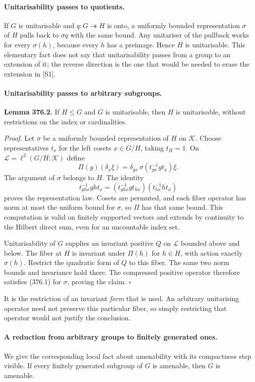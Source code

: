 \documentclass[11pt]{article}
\begin{document}
\paragraph{Unitarisability passes to quotients.}
If $G$ is unitarisable and $q:G\twoheadrightarrow H$ is onto, a
uniformly bounded representation $\sigma$ of $H$ pulls back to
$\sigma q$ with the same bound. Any unitariser of the pullback works
for every $\sigma(h)$, because every $h$ has a preimage. Hence $H$
is unitarisable. This elementary fact does not say that unitarisability
passes from a group to an extension of it; the reverse direction is
the one that would be needed to erase the extension in [S1].

\paragraph{Unitarisability passes to arbitrary subgroups.}
\textbf{Lemma 376.2.} If $H\le G$ and $G$ is unitarisable, then $H$
is unitarisable, without restrictions on the index or cardinalities.

\emph{Proof.} Let $\sigma$ be a uniformly bounded representation of
$H$ on $\mathcal K$. Choose representatives $t_x$ for the left cosets
$x\in G/H$, taking $t_H=1$. On
$\mathcal L=\ell^2(G/H;\mathcal K)$ define
\[
 \Pi(g)(\delta_x\xi)
  =\delta_{gx}\,\sigma(t_{gx}^{-1}g t_x)\xi.
 \tag{376.2}
\]
The argument of $\sigma$ belongs to $H$. The identity
\[
 t_{ghx}^{-1}gh t_x
 =(t_{ghx}^{-1}g t_{hx})(t_{hx}^{-1}h t_x)
\]
proves the representation law. Cosets are permuted, and each fiber
operator has norm at most the uniform bound for $\sigma$, so $\Pi$
has that same bound. This computation is valid on finitely supported
vectors and extends by continuity to the Hilbert direct sum, even for
an uncountable index set.

Unitarisability of $G$ supplies an invariant positive $Q$ on
$\mathcal L$ bounded above and below. The fiber at $H$ is invariant
under $\Pi(h)$ for $h\in H$, with action exactly $\sigma(h)$.
Restrict the quadratic form of $Q$ to this fiber. The same two norm
bounds and invariance hold there. The compressed positive operator
therefore satisfies (376.1) for $\sigma$, proving the claim.
\hfill$\square$

It is the restriction of an invariant \emph{form} that is used. An
arbitrary unitarising operator need not preserve this particular fiber,
so simply restricting that operator would not justify the conclusion.

\paragraph{A reduction from arbitrary groups to finitely generated ones.}
We give the corresponding local fact about amenability with its
compactness step visible. If every finitely generated subgroup of $G$
is amenable, then $G$ is amenable.
\end{document}
